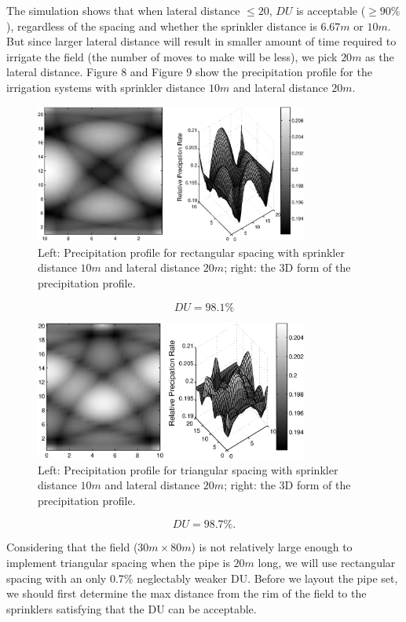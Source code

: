 \documentclass[12pt,a4paper,titlepage]{article}
\begin{document}
The simulation shows that when lateral distance $\leq 20$, $DU$ is
acceptable ($\geq 90\%$), regardless of the spacing and whether
the sprinkler distance is $6.67m$ or $10m$. But since larger
lateral distance will result in smaller amount of time required to
irrigate the field (the number of moves to make will be less), we
pick $20m$ as the lateral distance. Figure 8 and Figure 9 show the
precipitation profile for the irrigation systems with sprinkler
distance $10m$ and lateral distance $20m$.

\begin{figure}[!htb]
\centering
\includegraphics[width=0.8\textwidth]{fig08.eps} \caption{\label{fig08} Left: Precipitation profile for rectangular spacing with sprinkler distance $10m$ and lateral distance $20m$; right: the 3D form of the precipitation profile.}
\end{figure}


\[
 DU=98.1\%
\]

\begin{figure}[!htb]
\centering
\includegraphics[width=0.8\textwidth]{fig09.eps} \caption{\label{fig09} Left: Precipitation profile for triangular spacing with sprinkler distance $10m$ and lateral distance $20m$; right: the 3D form of the precipitation profile. }
\end{figure}

\[
 DU=98.7\%.
\]

Considering that the field ($30m\times80m$) is not relatively
large enough to implement triangular spacing when the pipe is
$20m$ long, we will use rectangular spacing with an only 0.7\%
neglectably weaker DU. Before we layout the pipe set, we should
first determine the max distance from the rim of the field to the
sprinklers satisfying that the DU can be acceptable.
\end{document}
